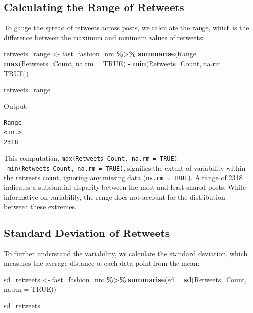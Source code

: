 \documentclass[
]{book}
\newenvironment{Shaded}{\begin{snugshade}}{\end{snugshade}}
\newcommand{\AttributeTok}[1]{\textcolor[rgb]{0.13,0.29,0.53}{#1}}
\newcommand{\ConstantTok}[1]{\textcolor[rgb]{0.56,0.35,0.01}{#1}}
\newcommand{\FunctionTok}[1]{\textcolor[rgb]{0.13,0.29,0.53}{\textbf{#1}}}
\newcommand{\NormalTok}[1]{#1}
\newcommand{\OtherTok}[1]{\textcolor[rgb]{0.56,0.35,0.01}{#1}}
\newcommand{\SpecialCharTok}[1]{\textcolor[rgb]{0.81,0.36,0.00}{\textbf{#1}}}
\begin{document}
\hypertarget{calculating-the-range-of-retweets}{%
\subsection{Calculating the Range of Retweets}\label{calculating-the-range-of-retweets}}

To gauge the spread of retweets across posts, we calculate the range, which is the difference between the maximum and minimum values of retweets:

\begin{Shaded}
\begin{Highlighting}[]
\NormalTok{retweets\_range }\OtherTok{\textless{}{-}}\NormalTok{ fast\_fashion\_nrc }\SpecialCharTok{\%\textgreater{}\%}
  \FunctionTok{summarise}\NormalTok{(}\AttributeTok{Range =} \FunctionTok{max}\NormalTok{(Retweets\_Count, }\AttributeTok{na.rm =} \ConstantTok{TRUE}\NormalTok{) }\SpecialCharTok{{-}} \FunctionTok{min}\NormalTok{(Retweets\_Count, }\AttributeTok{na.rm =} \ConstantTok{TRUE}\NormalTok{))}

\NormalTok{retweets\_range}
\end{Highlighting}
\end{Shaded}

Output:

\begin{verbatim}
Range
<int>
2318
\end{verbatim}

This computation, \texttt{max(Retweets\_Count,\ na.rm\ =\ TRUE)\ -\ min(Retweets\_Count,\ na.rm\ =\ TRUE)}, signifies the extent of variability within the retweets count, ignoring any missing data (\texttt{na.rm\ =\ TRUE}). A range of 2318 indicates a substantial disparity between the most and least shared posts. While informative on variability, the range does not account for the distribution between these extremes.

\hypertarget{standard-deviation-of-retweets}{%
\subsection{Standard Deviation of Retweets}\label{standard-deviation-of-retweets}}

To further understand the variability, we calculate the standard deviation, which measures the average distance of each data point from the mean:

\begin{Shaded}
\begin{Highlighting}[]
\NormalTok{sd\_retweets }\OtherTok{\textless{}{-}}\NormalTok{ fast\_fashion\_nrc }\SpecialCharTok{\%\textgreater{}\%}
  \FunctionTok{summarise}\NormalTok{(}\AttributeTok{sd =} \FunctionTok{sd}\NormalTok{(Retweets\_Count, }\AttributeTok{na.rm =} \ConstantTok{TRUE}\NormalTok{))}

\NormalTok{sd\_retweets}
\end{Highlighting}
\end{Shaded}
\end{document}
